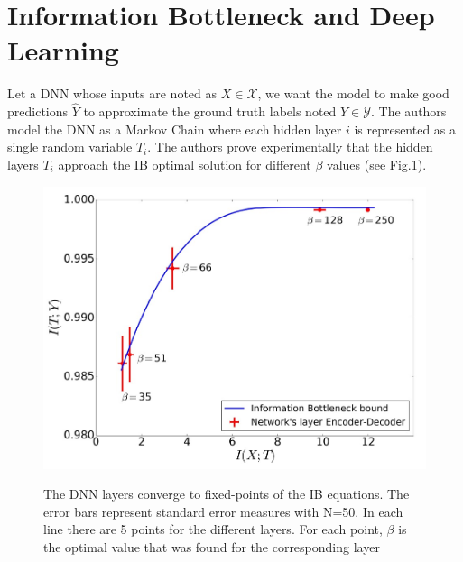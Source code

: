 \documentclass[twocolumn,superscriptaddress,aps]{revtex4-1}
\begin{document}
\section{Information Bottleneck and Deep Learning}

Let a DNN whose inputs are noted as $X \in \mathcal{X}$, we want the model to make good predictions $\hat{Y}$ to approximate the ground truth labels noted $Y \in \mathcal{Y}$. The authors model the DNN as a Markov Chain where each hidden layer $i$ is represented as  a single random variable $T_i$. The authors prove experimentally that the hidden layers $T_i$ approach the IB optimal solution for different $\beta$ values (see Fig.1).\\

\begin{figure}[!htb]
\includegraphics[width=\linewidth, height=\textheight, keepaspectratio]{figs/ib-curve.jpeg}
\label{fig:ib-curve}
\caption{The DNN layers converge to fixed-points of the IB equations. The error bars represent standard error measures with N=50. In each line there are 5 points for the different layers. For each point, $\beta$ is the optimal value that was found for the corresponding layer}
\end{figure}
\end{document}
